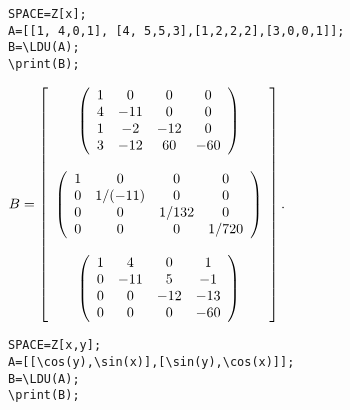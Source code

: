 \begin{verbatim}
SPACE=Z[x]; 
A=[[1, 4,0,1], [4, 5,5,3],[1,2,2,2],[3,0,0,1]];
B=\LDU(A);
\print(B);
\end{verbatim}

{$B = \left[\begin{array}{c}
\left(\begin{array}{cccc}1& 0&   0&   0  \\
 4& -11& 0&   0 \\
 1& -2&  -12& 0  \\
 3& -12& 60&  -60\\ 
\end{array}\right) \\ 
\null \\ 
\left(\begin{array}{cccc}1& 0&         0&       0      \\
 0& 1/(-11)& 0&       0      \\
 0& 0&         1/132& 0      \\
 0& 0&         0&       1/720\\ 
\end{array}\right) \\ 
\null \\
\left(\begin{array}{cccc}1& 4&   0&   1  \\
 0& -11& 5&   -1 \\
 0& 0&   -12& -13\\
 0& 0&   0&   -60\\ 
\end{array}\right)\\
 \end{array}\right].$
} 

\begin{verbatim}
SPACE=Z[x,y];
A=[[\cos(y),\sin(x)],[\sin(y),\cos(x)]];
B=\LDU(A);
\print(B);
\end{verbatim}

